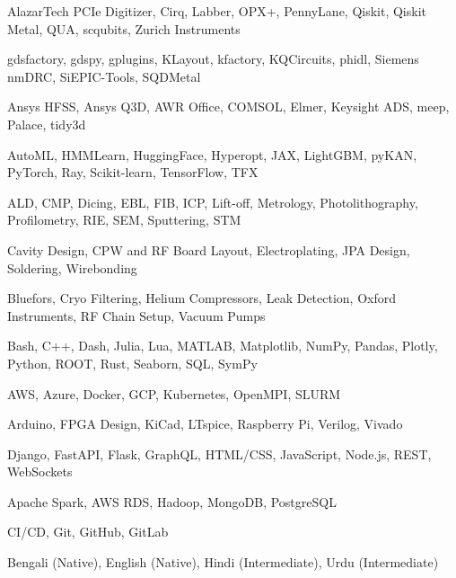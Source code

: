
\begin{cvskills}

    {AlazarTech PCIe Digitizer, Cirq, Labber, OPX+, PennyLane, Qiskit, Qiskit Metal, QUA, scqubits, Zurich Instruments}

    {gdsfactory, gdspy, gplugins, KLayout, kfactory, KQCircuits, phidl, Siemens nmDRC, SiEPIC-Tools, SQDMetal}

    {Ansys HFSS, Ansys Q3D, AWR Office, COMSOL, Elmer, Keysight ADS, meep, Palace, tidy3d}

    {AutoML, HMMLearn, HuggingFace, Hyperopt, JAX, LightGBM, pyKAN, PyTorch, Ray, Scikit-learn, TensorFlow, TFX}

    {ALD, CMP, Dicing, EBL, FIB, ICP, Lift-off, Metrology, Photolithography, Profilometry, RIE, SEM, Sputtering, STM}

    {Cavity Design, CPW and RF Board Layout, Electroplating, JPA Design, Soldering, Wirebonding}

    {Bluefors, Cryo Filtering, Helium Compressors, Leak Detection, Oxford Instruments, RF Chain Setup, Vacuum Pumps}

    {Bash, C++, Dash, Julia, Lua, MATLAB, Matplotlib, NumPy, Pandas, Plotly, Python, ROOT, Rust, Seaborn, SQL, SymPy}

    {AWS, Azure, Docker, GCP, Kubernetes, OpenMPI, SLURM}

    {Arduino, FPGA Design, KiCad, LTspice, Raspberry Pi, Verilog, Vivado}

    {Django, FastAPI, Flask, GraphQL, HTML/CSS, JavaScript, Node.js, REST, WebSockets}

    {Apache Spark, AWS RDS, Hadoop, MongoDB, PostgreSQL}

    {CI/CD, Git, GitHub, GitLab}

    {Bengali (Native), English (Native), Hindi (Intermediate), Urdu (Intermediate)}

\end{cvskills}
